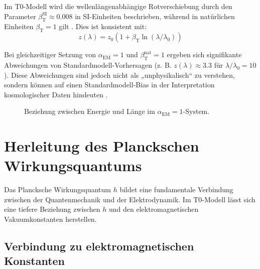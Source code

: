 \documentclass[12pt,a4paper]{article}
\newcommand{\betaT}{\beta_{\text{T}}}
\newcommand{\alphaEM}{\alpha_{\text{EM}}}
\begin{document}
	Im T0-Modell wird die wellenlängenabhängige Rotverschiebung durch den Parameter \(\betaT^{\text{SI}} \approx 0.008\) in SI-Einheiten beschrieben, während in natürlichen Einheiten \(\betaT = 1\) gilt \cite{pascher_params_2025}. Dies ist konsistent mit:
	\begin{equation}
		z(\lambda) = z_0 (1 + \betaT \ln(\lambda/\lambda_0))
	\end{equation}
	
	Bei gleichzeitiger Setzung von \(\alphaEM = 1\) und \(\betaT^{\text{nat}} = 1\) ergeben sich signifikante Abweichungen von Standardmodell-Vorhersagen (z. B. \(z(\lambda) \approx 3.3\) für \(\lambda/\lambda_0 = 10\)). Diese Abweichungen sind jedoch nicht als „unphysikalisch“ zu verstehen, sondern können auf einen Standardmodell-Bias in der Interpretation kosmologischer Daten hindeuten \cite{pascher_alphabeta_2025}.
	
	\begin{figure}[h]
		\centering
		\caption{Beziehung zwischen Energie und Länge im \(\alphaEM = 1\)-System.}
	\end{figure}
	
	\section{Herleitung des Planckschen Wirkungsquantums}
	
	Das Plancksche Wirkungsquantum \(h\) bildet eine fundamentale Verbindung zwischen der Quantenmechanik und der Elektrodynamik. Im T0-Modell lässt sich eine tiefere Beziehung zwischen \(h\) und den elektromagnetischen Vakuumkonstanten herstellen.
	
	\subsection{Verbindung zu elektromagnetischen Konstanten}
	
\end{document}
